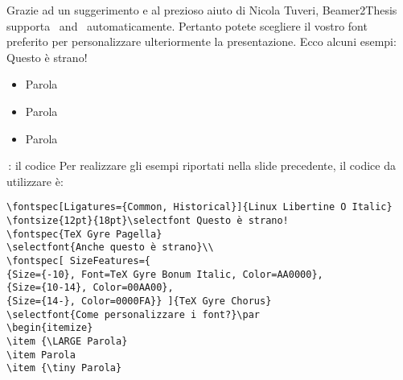 \begin{tframe}{\XeLaTeX}
Grazie ad un suggerimento e al prezioso aiuto di Nicola Tuveri, Beamer2Thesis supporta \XeTeX\, and \XeLaTeX\, automaticamente.
Pertanto potete scegliere il vostro font preferito per personalizzare ulteriormente la presentazione. Ecco alcuni esempi:\\
\fontsize{12pt}{18pt}\selectfont Questo è strano! 
\selectfont{Anche questo è strano}\\
\selectfont{Come personalizzare i font?}\par
\begin{itemize}
\item {\LARGE Parola}
\item Parola
\item {\tiny Parola}
\end{itemize}
\end{tframe}

\begin{frame}[t,fragile]{\XeLaTeX\,: il codice}
Per realizzare gli esempi riportati nella slide precedente, il codice da utilizzare è:
\scriptsize{
\begin{verbatim}
\fontspec[Ligatures={Common, Historical}]{Linux Libertine O Italic}
\fontsize{12pt}{18pt}\selectfont Questo è strano! 
\fontspec{TeX Gyre Pagella}
\selectfont{Anche questo è strano}\\
\fontspec[ SizeFeatures={
{Size={-10}, Font=TeX Gyre Bonum Italic, Color=AA0000},
{Size={10-14}, Color=00AA00},
{Size={14-}, Color=0000FA}} ]{TeX Gyre Chorus}
\selectfont{Come personalizzare i font?}\par
\begin{itemize}
\item {\LARGE Parola}
\item Parola
\item {\tiny Parola}
\end{verbatim}
}
\end{frame}

